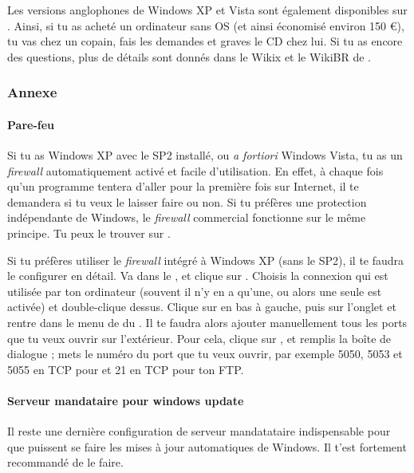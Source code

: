 Les versions anglophones de Windows XP et Vista sont également disponibles sur .
Ainsi, si tu as acheté un ordinateur sans OS (et ainsi économisé environ 150 \euro), tu vas chez un copain, fais les demandes et graves le CD chez lui. Si tu as encore des questions, plus de détails sont donnés dans le Wikix et le WikiBR de \fkz.


\subsubsection{Annexe}

\label{horsdomaine} %

\paragraph{Pare-feu} Si tu as Windows XP avec le SP2 installé, ou \emph{a fortiori}
Windows Vista, tu as un \emph{firewall} automatiquement activé et facile d'utilisation. En effet, à chaque fois qu'un programme tentera d'aller pour
la première fois sur Internet, il te demandera si tu veux le laisser faire ou non. Si tu préfères une protection indépendante de Windows, le
\emph{firewall} commercial  fonctionne sur le même principe. Tu peux le trouver sur \xshare.

Si tu préfères utiliser le \emph{firewall} intégré à Windows XP (sans le SP2), il te faudra le configurer en détail. Va dans le ,
 et clique sur . Choisis la connexion qui est utilisée par ton ordinateur (souvent il n'y en a qu'une, ou
alors une seule est activée) et double-clique dessus. Clique sur  en bas à gauche, puis sur l'onglet  et rentre dans le
menu de  du . Il te faudra alors ajouter manuellement tous les ports que tu veux ouvrir sur l'extérieur. Pour
cela, clique sur , et remplis la boîte de dialogue%
; mets le numéro du port que tu veux ouvrir, par exemple 5050, 5053 et 5055 en TCP pour  et 21 en TCP pour ton FTP.

\paragraph{Serveur mandataire pour windows update} Il reste une dernière configuration de
serveur mandatataire indispensable pour que puissent se faire les mises à jour automatiques
de Windows. Il t'est fortement recommandé de le faire.

